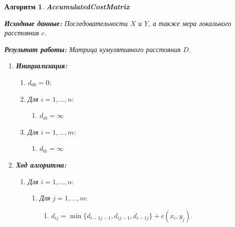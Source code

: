 \documentclass[a4paper, 14pt]{extarticle}
\numberwithin{figure}{subsection}
\numberwithin{equation}{subsection}
\newtheorem{algorithm}{Алгоритм}[subsection]
\begin{document}
\begin{algorithm} {\bf AccumulatedCostMatrix}

{\bf Исходные данные:} Последовательности $X$ и $Y$, а также мера локального расстояния $c$.

{\bf Результат работы:} Матрица кумулятивного расстояния $D$.
\begin{enumerate}[parsep = 0pt]
\item {\bf Инициализация:}
\begin{enumerate}[1.,labelindent=0pt,labelsep=40pt,parsep = 0pt]
\setcounter{enumii}{\number\numexpr\value{enumi}}
\item $d_{0 0} = 0;$
\item Для $i=1,\dots,n:$
\begin{enumerate}[1.,labelindent=0pt,labelsep=80pt,parsep = 0pt]
\setcounter{enumiii}{\number\numexpr\value{enumii}}
\item $d_{i 0} = \infty$
\setcounter{enumii}{\number\numexpr\value{enumiii}}
\end{enumerate}
\item Для $i=1,\dots,m:$
\begin{enumerate}[1.,labelindent=0pt,labelsep=80pt,parsep = 0pt]
\setcounter{enumiii}{\number\numexpr\value{enumii}}
\item $d_{0 i} = \infty$
\setcounter{enumii}{\number\numexpr\value{enumiii}}
\end{enumerate}
\setcounter{enumi}{\number\numexpr\value{enumii}}
\end{enumerate}
\item {\bf Ход алгоритма:}
\begin{enumerate}[1.,labelindent=0pt,labelsep=40pt,parsep = 0pt]
\setcounter{enumii}{\number\numexpr\value{enumi}}
\item Для $i = 1,\dots, n:$
\begin{enumerate}[1.,labelindent=0pt,labelsep=80pt,parsep = 0pt]
\setcounter{enumiii}{\number\numexpr\value{enumii}}
\item Для $j=1,\dots,m:$
\begin{enumerate}[1.,labelindent=0pt,labelsep=140pt,parsep = 0pt]
\setcounter{enumiv}{\number\numexpr\value{enumiii}}
\item $d_{ij} = \min\{d_{i-1 j-1}, d_{i j-1}, d_{i-1 j}\} + c(x_i, y_j).$
\setcounter{enumiii}{\number\numexpr\value{enumiv}}
\end{enumerate}
\setcounter{enumii}{\number\numexpr\value{enumiii}}
\end{enumerate}
\setcounter{enumi}{\number\numexpr\value{enumii}}
\end{enumerate}
\end{enumerate}
\end{algorithm}
\end{document}
